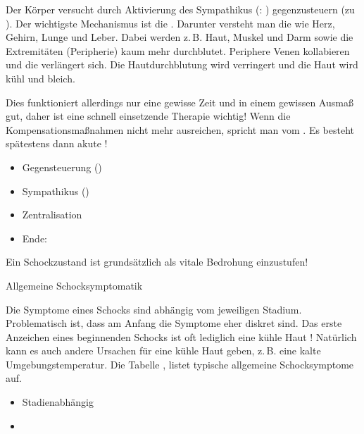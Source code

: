 {%
%
%
Der Körper versucht durch Aktivierung des Sympathikus (: )
gegenzusteuern (zu ). Der wichtigste
Mechanismus ist die
. Darunter versteht
man die 
wie Herz, Gehirn, Lunge und Leber. Dabei werden z.\,B. Haut,
Muskel und Darm sowie die Extremitäten (Peripherie) kaum
mehr  durchblutet.
Periphere Venen kollabieren und die 
verlängert sich. Die Hautdurchblutung wird verringert und
die Haut wird kühl und bleich.

Dies funktioniert allerdings nur eine
gewisse Zeit und in einem gewissen Ausmaß gut, daher ist
eine schnell  einsetzende Therapie wichtig! 
Wenn die Kompensationsmaßnahmen nicht mehr ausreichen, spricht man vom . Es besteht
spätestens dann akute !
}{
\begin{itemize}
    \item {Gegensteuerung} ()
    \item Sympathikus ()
    \item Zentralisation
    \item Ende: 
\end{itemize}
}{}{}{}





\begin{Danger}
  \item Ein Schockzustand ist grundsätzlich als vitale
  Bedrohung einzustufen!
\end{Danger}



\TextSlide
{Allgemeine Schocksymptomatik}
{\label{topic:schock-allgemeine-symptomatik}%
%
Die Symptome eines Schocks sind abhängig vom jeweiligen
Stadium. Problematisch ist, dass am Anfang die Symptome
eher diskret sind. Das erste Anzeichen eines beginnenden Schocks ist
oft lediglich eine kühle
Haut \cite{Kaplan2001}! Natürlich kann es
auch andere Ursachen für eine kühle Haut geben, z.\,B. eine
kalte Umgebungstemperatur. Die Tabelle
, listet typische
allgemeine Schocksymptome auf.


}
{%
\begin{itemize}
  \item Stadienabhängig
  \item {}
\end{itemize}
}
{}
{}
{}

